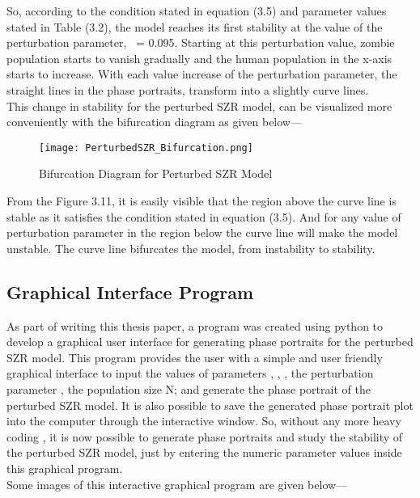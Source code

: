 So, according to the condition stated in equation (3.5) and parameter values stated in Table (3.2), the model reaches its first stability at the value of the perturbation parameter, \textmu \ = 0.095. Starting at this perturbation value, zombie population starts to vanish gradually and the human population in the x-axis starts to increase. With each value increase of the perturbation parameter, the straight lines in the phase portraits, transform into a slightly curve lines. \\

This change in stability for the perturbed SZR model, can be visualized more conveniently with the bifurcation diagram as given below--- \\

\begin{figure}[H]
\centering
\texttt{[image: PerturbedSZR\_Bifurcation.png]}
\caption{Bifurcation Diagram for Perturbed SZR Model}
\label{fig:Perturbed SZR Bifurcation}
\end{figure}

From the Figure 3.11, it is easily visible that the region above the curve line is stable as it satisfies the condition stated in equation (3.5). And for any value of perturbation parameter in the region below the curve line will make the model unstable. The curve line bifurcates the model, from instability to stability. 

\pagebreak
\subsection{Graphical Interface Program}

As part of writing this thesis paper, a program was created using python to develop a graphical user interface for generating phase portraits for the perturbed SZR model. This program provides the user with a simple and user friendly graphical interface to input the values of parameters \textalpha, \textbeta, \textzeta, the perturbation parameter \textmu, the population size N; and generate the phase portrait of the perturbed SZR model. It is also possible to save the generated phase portrait plot into the computer through the interactive window. So, without any more heavy coding , it is now possible to generate phase portraits and study the stability of the perturbed SZR model, just by entering the numeric parameter values inside this graphical program. \\

Some images of this interactive graphical program are given below---\\

